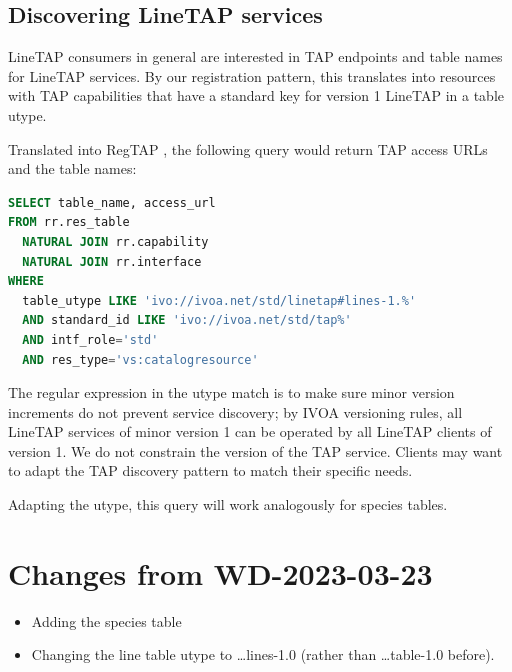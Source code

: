 \documentclass[11pt,a4paper]{ivoa}
\begin{document}
\subsection{Discovering LineTAP services}

LineTAP consumers in general are interested in TAP endpoints and table names for
LineTAP services.  By our registration pattern, this translates into
resources with TAP capabilities that have a standard key for version 1
LineTAP in a table utype.

Translated into RegTAP \citep{2019ivoa.spec.1011D}, the following query
would return TAP access URLs and the table names:

\begin{lstlisting}[language=SQL]
SELECT table_name, access_url
FROM rr.res_table
  NATURAL JOIN rr.capability
  NATURAL JOIN rr.interface
WHERE
  table_utype LIKE 'ivo://ivoa.net/std/linetap#lines-1.%'
  AND standard_id LIKE 'ivo://ivoa.net/std/tap%'
  AND intf_role='std'
  AND res_type='vs:catalogresource'
\end{lstlisting}

The regular expression in the utype match is to make sure minor version
increments do not prevent service discovery; by IVOA versioning rules,
all LineTAP services of minor version 1 can be operated by all LineTAP
clients of version 1.  We do not constrain the version of the TAP
service. Clients may want to adapt the TAP discovery pattern to match
their specific needs.

Adapting the utype, this query will work analogously for species tables.

\appendix
\section{Changes from WD-2023-03-23}

\begin{itemize}
\item Adding the species table
\item Changing the line table utype to \dots lines-1.0 (rather than
\dots table-1.0 before).
\end{itemize}



\end{document}
